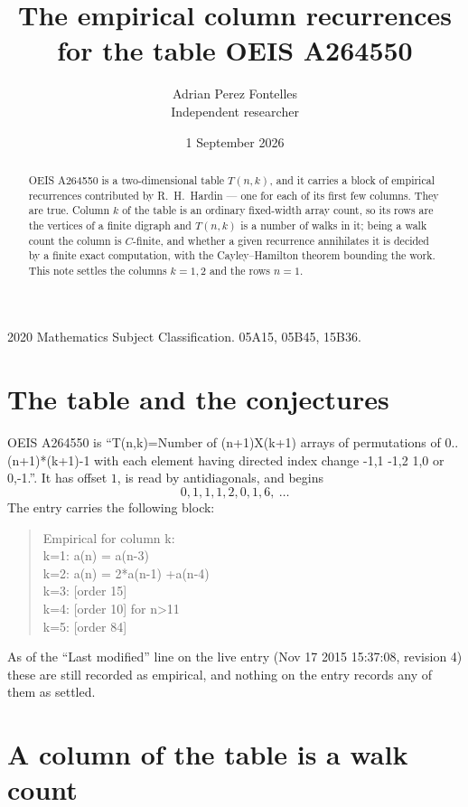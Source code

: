 \documentclass[11pt,a4paper]{article}
\title{The empirical column recurrences for the table OEIS A264550}
\author{Adrian Perez Fontelles\\ \small Independent researcher}
\date{1 September 2026}
\theoremstyle{plain}
\theoremstyle{definition}
\begin{document}
\maketitle

\begin{abstract}
OEIS A264550 is a two-dimensional table $T(n,k)$, and it carries a block of empirical
recurrences contributed by R.~H.~Hardin --- one for each of its first few columns. They are
true. Column $k$ of the table is an ordinary fixed-width array count, so its rows are the
vertices of a finite digraph and $T(n,k)$ is a number of walks in it; being a walk count the
column is $C$-finite, and whether a given recurrence annihilates it is decided by a finite
exact computation, with the Cayley--Hamilton theorem bounding the work. This note settles the columns $k=1, 2$ and the rows $n=1$.
\end{abstract}

\noindent\small 2020 Mathematics Subject Classification. 05A15, 05B45, 15B36.\normalsize

\section{The table and the conjectures}

OEIS A264550 is ``T(n,k)=Number of (n+1)X(k+1) arrays of permutations of 0..(n+1)*(k+1)-1 with each element having directed index change -1,1 -1,2 1,0 or 0,-1.''. It has offset $1$, is
read by antidiagonals, and begins
\[
0, 1, 1, 1, 2, 0, 1, 6,\ \dots
\]
The entry carries the following block:
\begin{quote}\small
Empirical for column k:\\
k=1: a(n) = a(n-3)\\
k=2: a(n) = 2*a(n-1) +a(n-4)\\
k=3: [order 15]\\
k=4: [order 10] for n>11\\
k=5: [order 84]\\
\end{quote}
As of the ``Last modified'' line on the live entry (Nov 17 2015 15:37:08, revision 4) these are still
recorded as empirical, and nothing on the entry records any of them as settled.

\section{A column of the table is a walk count}
\end{document}
